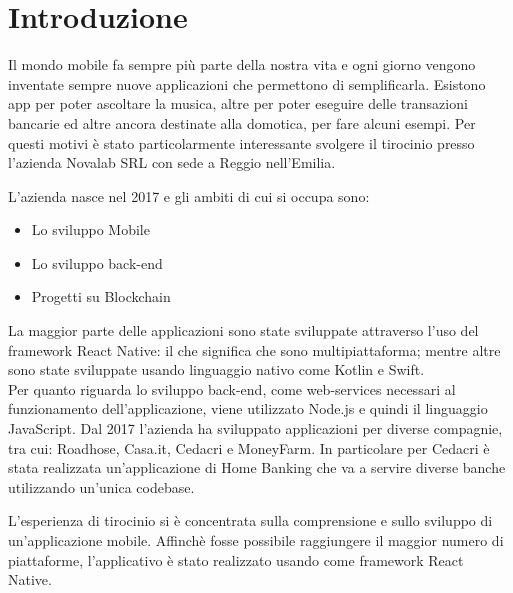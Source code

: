 \chapter*{Introduzione} %
\markboth{}{}
Il mondo mobile fa sempre pi\`u parte della nostra vita e ogni giorno vengono inventate sempre nuove applicazioni che permettono di semplificarla. Esistono app
per poter ascoltare la musica, altre per poter eseguire delle transazioni bancarie ed altre ancora destinate alla domotica, per fare alcuni esempi.
Per questi motivi \`e stato particolarmente interessante svolgere il tirocinio presso l'azienda Novalab SRL con sede a Reggio nell'Emilia.

L'azienda nasce nel 2017 e gli ambiti di cui si occupa sono:
\begin{itemize}
    \item Lo sviluppo Mobile
    \item Lo sviluppo back-end 
    \item Progetti su Blockchain
\end{itemize}
La maggior parte delle applicazioni sono state sviluppate attraverso l'uso del framework React Native: il che significa che sono multipiattaforma; mentre altre sono state sviluppate usando linguaggio nativo come Kotlin e Swift. \\
Per quanto riguarda lo sviluppo back-end, come web-services necessari al funzionamento dell'applicazione, viene utilizzato Node.js e quindi il linguaggio JavaScript.
Dal 2017 l'azienda ha sviluppato applicazioni per diverse compagnie, tra cui: Roadhose, Casa.it, Cedacri e MoneyFarm. In particolare per Cedacri \`e stata realizzata 
un'applicazione di Home Banking che va a servire diverse banche utilizzando un'unica codebase.

L'esperienza di tirocinio si \`e concentrata sulla comprensione e sullo sviluppo di un'applicazione mobile. Affinch\`e fosse possibile raggiungere il maggior numero di piattaforme, 
l'applicativo \`e stato realizzato usando come framework React Native.

